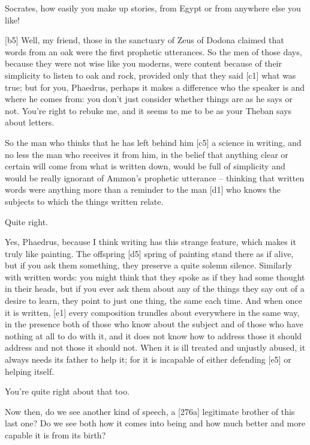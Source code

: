  Socrates, how easily you make up stories, from Egypt or from
anywhere else you like!

{[}b5{]}  Well, my friend, those in the sanctuary of Zeus of
Dodona claimed that words from an oak were the first prophetic
utterances. So the men of those days, because they were not wise like
you moderns, were content because of their simplicity to listen to oak
and rock, provided only
that they said {[}c1{]} what was true; but for you, Phaedrus, perhaps it
makes a difference who the speaker is and where he comes from: you don't
just consider whether things are as he says or not.  You're
right to rebuke me, and it seems to me to be as your Theban says about
letters.

 So the man who thinks that he has left behind him {[}c5{]} a
science in writing, and no less the man who receives it from him, in the
belief that anything clear or certain will come from what is written
down, would be full of simplicity and would be really ignorant of
Ammon's prophetic utterance -- thinking that written words were anything
more than a reminder to the man {[}d1{]} who knows the subjects to which
the things written relate.

 Quite right.

 Yes, Phaedrus, because I think writing has this strange
feature, which makes it truly like painting. The offspring {[}d5{]}
spring of painting stand there as if alive, but if you ask them
something, they preserve a quite solemn silence. Similarly with written
words: you might think that they spoke as if they had some thought in
their heads, but if you ever ask them about any of the things they say
out of a desire to learn, they point to just one thing, the same each
time. And when once it is written, {[}e1{]} every composition trundles
about everywhere in the same way, in the presence both of those who know
about the subject and of those who have nothing at all to do with it,
and it does not know how to address those it should address and not
those it should not. When it is ill treated and unjustly abused, it
always needs its father to help it; for it is incapable of either
defending {[}e5{]} or helping itself.

 You're quite right about that too.

 Now then, do we see another kind of
speech, a {[}276a{]}
legitimate brother of this last one? Do we see both how it comes into
being and how much better and more capable it is from its birth?

